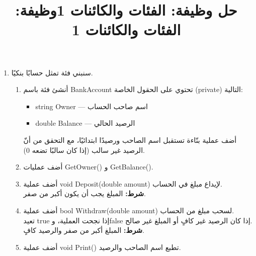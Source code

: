 \documentclass[14pt]{extarticle}
\title{حل وظيفة: الفئات والكائنات 1}
\title{وظيفة: الفئات والكائنات 1}
\begin{document}
\maketitle
\thispagestyle{fancy}

\begin{enumerate}[itemsep=2em]

\item
سنبني فئة تمثل حسابًا بنكيًا.
\begin{enumerate}[itemsep=1em]
    \item أنشئ فئة باسم \textenglish{BankAccount} تحتوي على الحقول الخاصة (\textenglish{private}) التالية:
    \begin{itemize}[itemsep=1pt]
        \item \textenglish{string Owner} — اسم صاحب الحساب
        \item \textenglish{double Balance} — الرصيد الحالي
    \end{itemize}
    أضف عملية بنّاءة تستقبل اسم الصاحب ورصيدًا ابتدائيًا، مع التحقق من أنّ الرصيد غير سالب (إذا كان سالبًا تضعه 0).

    \item أضف عمليات \textenglish{GetOwner()} و \textenglish{GetBalance()}.

    \item أضف عملية \textenglish{void Deposit(double amount)} لإيداع مبلغ في الحساب.\\
    \textbf{شرط:} المبلغ يجب أن يكون أكبر من صفر.

    \item أضف عملية \textenglish{bool Withdraw(double amount)} لسحب مبلغ من الحساب.\\
    تعيد \textenglish{true} إذا نجحت العملية، و\textenglish{false} إذا كان الرصيد غير كافٍ أو المبلغ غير صالح.\\
    \textbf{شرط:} المبلغ أكبر من صفر والرصيد كافٍ.

    \item أضف عملية \textenglish{void Print()} تطبع اسم الصاحب والرصيد.


\end{enumerate}
\end{enumerate}
\end{document}
